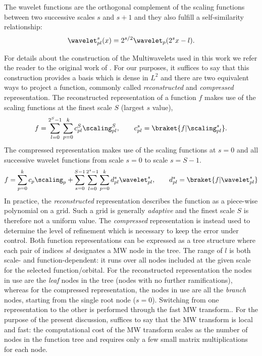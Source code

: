 The wavelet functions are  the orthogonal complement of the scaling functions between two successive scales $s$ and $s+1$ and they also fulfill a self-similarity relationship:
\begin{equation}
    \wavelet^s_{pl}(x) = 2^{s/2} \wavelet_p(2^s x - l).
\end{equation}

For details about the construction of the Multiwavelets used in this work we refer the reader to the original work of \citeauthor{Alpert.10.1137/0524016}. \cite{Alpert.10.1137/0524016}
For our purposes, it suffices to say that this construction provides a basis which is dense in $L^2$ and there are two equivalent ways to project a function, commonly called \emph{reconstructed} and \emph{compressed} representation. The reconstructed representation of a function $f$ makes use of the scaling functions at the finest scale $S$ (largest $s$ value), 
\begin{equation}\label{eq:reconstructed_func}
  f = \sum_{l=0}^{2^S-1}\sum_{p=0}^k c^S_{pl} \scaling^S_{pl}, \qquad c^s_{pl} = \braket{f | \scaling^s_{pl}}. 
\end{equation}
The compressed representation makes use of the scaling functions at $s=0$ and all successive wavelet functions from scale $s=0$ to scale $s=S-1$.
\begin{equation}\label{eq:compressed_func}
  f = \sum_{p=0}^k c_{p} \scaling_p + \sum_{s=0}^{S-1} \sum_{l=0}^{2^s-1} \sum_{p=0}^k d^s_{pl} \wavelet^s_{pl}, \qquad d^s_{pl} = \braket{f | \wavelet^s_{pl}}
\end{equation}
In practice, the \emph{reconstructed} representation describes the function as a piece-wise polynomial on a grid. Such a grid is generally \emph{adaptive} and the finest scale $S$ is therefore not a uniform value. The \emph{compressed} representation is instead used to determine the level of refinement which is necessary to keep the error under control.  Both function representations can be expressed as a tree structure where each pair of indices $sl$ designates a \ac{MW} node in the tree. The range of $l$ is both scale- and function-dependent: it runs over all nodes included at the given scale for the selected function/orbital. For the reconstructed representation the nodes in use are the \emph{leaf} nodes in the tree (nodes with no further ramifications), whereas for the compressed representation, the nodes in use are all the \emph{branch} nodes, starting from the single root node ($s=0$).
Switching from one representation to the other is performed through the fast \ac{MW} transform.\cite{Beylkin.10.1002/cpa.3160440202,Frediani.10.1080/00268976.2013.810793}. For the purpose of the present discussion, suffices to say that the \ac{MW} transform is local and fast: the computational cost of the \ac{MW} transform scales as the number of nodes in the function tree and requires only a few small matrix multiplications for each node.

